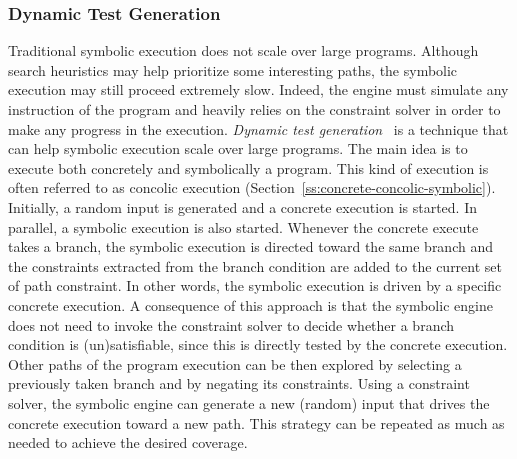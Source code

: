\subsubsection{Dynamic Test Generation}
Traditional symbolic execution does not scale over large programs. Although search heuristics may help prioritize some interesting paths, the symbolic execution may still proceed extremely slow. Indeed, the engine must simulate any instruction of the program and heavily relies on the constraint solver in order to make any progress in the execution. {\em Dynamic test generation}~\cite{DART-PLDI05} is a technique that can help symbolic execution scale over large programs. The main idea is to execute both concretely and symbolically a program. This kind of execution is often referred to as concolic execution (Section~\ref{ss:concrete-concolic-symbolic}). Initially, a random input is generated and a concrete execution is started. In parallel, a symbolic execution is also started. Whenever the concrete execute takes a branch, the symbolic execution is directed toward the same branch and the constraints extracted from the branch condition are added to the current set of path constraint. In other words, the symbolic execution is driven by a specific concrete execution. A consequence of this approach is that the symbolic engine does not need to invoke the constraint solver to decide whether a branch condition is (un)satisfiable, since this is directly tested by the concrete execution. Other paths of the program execution can be then explored by selecting a previously taken branch and by negating its constraints. Using a constraint solver, the symbolic engine can generate a new (random) input that drives the concrete execution toward a new path. This strategy can be repeated as much as needed to achieve the desired coverage.

